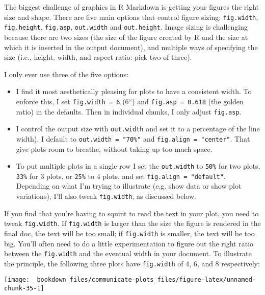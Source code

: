 \documentclass[]{book}
\begin{document}
The biggest challenge of graphics in R Markdown is getting your figures
the right size and shape. There are five main options that control
figure sizing: \texttt{fig.width}, \texttt{fig.height},
\texttt{fig.asp}, \texttt{out.width} and \texttt{out.height}. Image
sizing is challenging because there are two sizes (the size of the
figure created by R and the size at which it is inserted in the output
document), and multiple ways of specifying the size (i.e., height,
width, and aspect ratio: pick two of three).

I only ever use three of the five options:

\begin{itemize}
\item
  I find it most aesthetically pleasing for plots to have a consistent
  width. To enforce this, I set \texttt{fig.width\ =\ 6} (6``) and
  \texttt{fig.asp\ =\ 0.618} (the golden ratio) in the defaults. Then in
  individual chunks, I only adjust \texttt{fig.asp}.
\item
  I control the output size with \texttt{out.width} and set it to a
  percentage of the line width). I default to
  \texttt{out.width\ =\ "70\%"} and \texttt{fig.align\ =\ "center"}.
  That give plots room to breathe, without taking up too much space.
\item
  To put multiple plots in a single row I set the \texttt{out.width} to
  \texttt{50\%} for two plots, \texttt{33\%} for 3 plots, or
  \texttt{25\%} to 4 plots, and set \texttt{fig.align\ =\ "default"}.
  Depending on what I'm trying to illustrate (e.g. show data or show
  plot variations), I'll also tweak \texttt{fig.width}, as discussed
  below.
\end{itemize}

If you find that you're having to squint to read the text in your plot,
you need to tweak \texttt{fig.width}. If \texttt{fig.width} is larger
than the size the figure is rendered in the final doc, the text will be
too small; if \texttt{fig.width} is smaller, the text will be too big.
You'll often need to do a little experimentation to figure out the right
ratio between the \texttt{fig.width} and the eventual width in your
document. To illustrate the principle, the following three plots have
\texttt{fig.width} of 4, 6, and 8 respectively:

\begin{center}\texttt{[image: \_bookdown\_files/communicate-plots\_files/figure-latex/unnamed-chunk-35-1]} \end{center}
\end{document}
